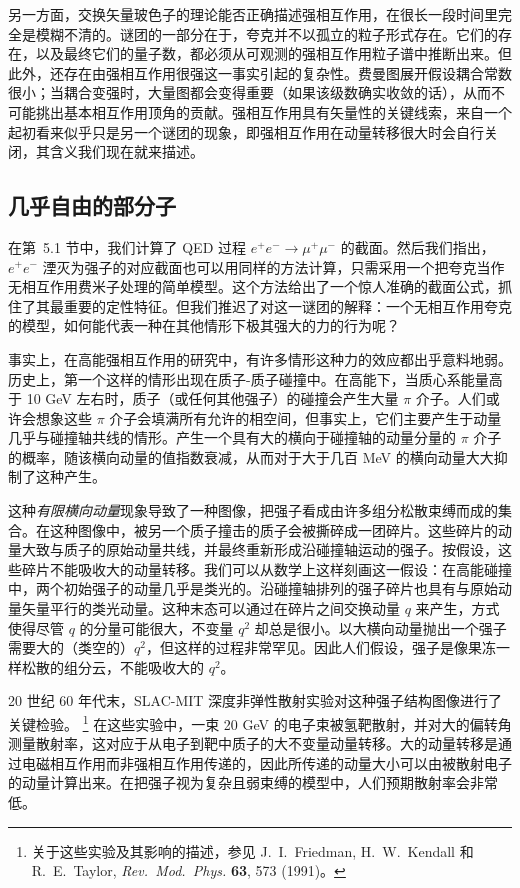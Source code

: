 另一方面，交换矢量玻色子的理论能否正确描述强相互作用，在很长一段时间里完全是模糊不清的。谜团的一部分在于，夸克并不以孤立的粒子形式存在。它们的存在，以及最终它们的量子数，都必须从可观测的强相互作用粒子谱中推断出来。但此外，还存在由强相互作用很强这一事实引起的复杂性。费曼图展开假设耦合常数很小；当耦合变强时，大量图都会变得重要（如果该级数确实收敛的话），从而不可能挑出基本相互作用顶角的贡献。强相互作用具有矢量性的关键线索，来自一个起初看来似乎只是另一个谜团的现象，即强相互作用在动量转移很大时会自行关闭，其含义我们现在就来描述。

\subsection*{几乎自由的部分子}

在第~5.1 节中，我们计算了 QED 过程 $e^{+}e^{-}\to\mu^{+}\mu^{-}$ 的截面。然后我们指出，$e^{+}e^{-}$ 湮灭为强子的对应截面也可以用同样的方法计算，只需采用一个把夸克当作无相互作用费米子处理的简单模型。这个方法给出了一个惊人准确的截面公式，抓住了其最重要的定性特征。但我们推迟了对这一谜团的解释：一个无相互作用夸克的模型，如何能代表一种在其他情形下极其强大的力的行为呢？

事实上，在高能强相互作用的研究中，有许多情形这种力的效应都出乎意料地弱。历史上，第一个这样的情形出现在质子-质子碰撞中。在高能下，当质心系能量高于 10 GeV 左右时，质子（或任何其他强子）的碰撞会产生大量 $\pi$ 介子。人们或许会想象这些 $\pi$ 介子会填满所有允许的相空间，但事实上，它们主要产生于动量几乎与碰撞轴共线的情形。产生一个具有大的横向于碰撞轴的动量分量的 $\pi$ 介子的概率，随该横向动量的值指数衰减，从而对于大于几百 MeV 的横向动量大大抑制了这种产生。

这种\emph{有限横向动量}现象导致了一种图像，把强子看成由许多组分松散束缚而成的集合。在这种图像中，被另一个质子撞击的质子会被撕碎成一团碎片。这些碎片的动量大致与质子的原始动量共线，并最终重新形成沿碰撞轴运动的强子。按假设，这些碎片不能吸收大的动量转移。我们可以从数学上这样刻画这一假设：在高能碰撞中，两个初始强子的动量几乎是类光的。沿碰撞轴排列的强子碎片也具有与原始动量矢量平行的类光动量。这种末态可以通过在碎片之间交换动量 $q$ 来产生，方式使得尽管 $q$ 的分量可能很大，不变量 $q^2$ 却总是很小。以大横向动量抛出一个强子需要大的（类空的）$q^2$，但这样的过程非常罕见。因此人们假设，强子是像果冻一样松散的组分云，不能吸收大的 $q^2$。

20 世纪 60 年代末，SLAC-MIT 深度非弹性散射实验对这种强子结构图像进行了关键检验。%
\footnote{关于这些实验及其影响的描述，参见 J.~I.~Friedman, H.~W.~Kendall 和 R.~E.~Taylor, \emph{Rev.\ Mod.\ Phys.} \textbf{63}, 573 (1991)。} 在这些实验中，一束 20 GeV 的电子束被氢靶散射，并对大的偏转角测量散射率，这对应于从电子到靶中质子的大不变量动量转移。大的动量转移是通过电磁相互作用而非强相互作用传递的，因此所传递的动量大小可以由被散射电子的动量计算出来。在把强子视为复杂且弱束缚的模型中，人们预期散射率会非常低。

